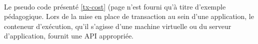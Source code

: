 {  \paragraph{} Le pseudo code présenté \ref{tx-cost} (page \pageref{tx-cost} n'est fourni
  qu'à titre d'exemple pédagogique. Lors de la mise en place de transaction au sein d'une
  application, le conteneur d'exécution, qu'il s'agisse d'une machine virtuelle ou du serveur
  d'application, fournit une API appropriée.

}


